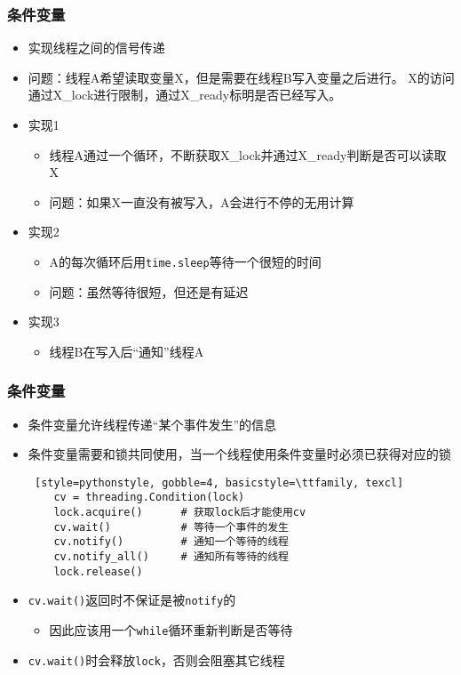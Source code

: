 \begin{frame}
	\frametitle{条件变量}
	\begin{itemize}
	\item 实现线程之间的信号传递
	\item 问题：线程A希望读取变量X，但是需要在线程B写入变量之后进行。
			X的访问通过X\_lock进行限制，通过X\_ready标明是否已经写入。
	\item 实现1
		\begin{itemize}
		\item 线程A通过一个循环，不断获取X\_lock并通过X\_ready判断是否可以读取X
		\item 问题：如果X一直没有被写入，A会进行不停的无用计算
		\end{itemize}
	\item 实现2
		\begin{itemize}
		\item A的每次循环后用\texttt{time.sleep}等待一个很短的时间
		\item 问题：虽然等待很短，但还是有延迟
		\end{itemize}
	\item 实现3
		\begin{itemize}
		\item 线程B在写入后``通知''线程A
		\end{itemize}
	\end{itemize}
\end{frame}

\begin{frame} [fragile]
	\frametitle{条件变量}
	\begin{itemize}
	\item 条件变量允许线程传递``某个事件发生''的信息
	\item 条件变量需要和锁共同使用，当一个线程使用条件变量时必须已获得对应的锁
	\begin{lstlisting} [style=pythonstyle, gobble=4, basicstyle=\ttfamily, texcl]
	cv = threading.Condition(lock)
	lock.acquire()		# 获取lock后才能使用cv
	cv.wait()			# 等待一个事件的发生
	cv.notify()			# 通知一个等待的线程
	cv.notify_all()		# 通知所有等待的线程
	lock.release()
	\end{lstlisting}
	\item \texttt{cv.wait()}返回时不保证是被\texttt{notify}的
		\begin{itemize}
		\item 因此应该用一个\texttt{while}循环重新判断是否等待
		\end{itemize}
	\item \texttt{cv.wait()}时会释放\texttt{lock}，否则会阻塞其它线程
	\end{itemize}
\end{frame}

